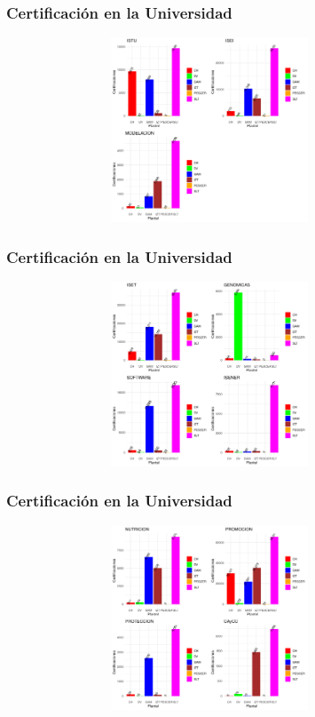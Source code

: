 \documentclass[xcolor=dvipsnames]{beamer}
\begin{document}
\begin{frame}\frametitle{Certificaci\'on en la Universidad}
\textbf{
}
\begin{figure}[H]
\centering
\includegraphics[width=10cm,height=5.5cm]{Imagenes/GraficasCertificacionLicenciaturas1.pdf}
\end{figure}
\end{frame}


\begin{frame}\frametitle{Certificaci\'on en la Universidad}
\textbf{
}
\begin{figure}[H]
\centering
\includegraphics[width=10cm,height=5.5cm]{Imagenes/GraficasCertificacionLicenciaturas2.pdf}
\end{figure}
\end{frame}



\begin{frame}\frametitle{Certificaci\'on en la Universidad}
\textbf{
}
\begin{figure}[H]
\centering
\includegraphics[width=10cm,height=5.5cm]{Imagenes/GraficasCertificacionLicenciaturas3.pdf}
\end{figure}
\end{frame}
\end{document}
